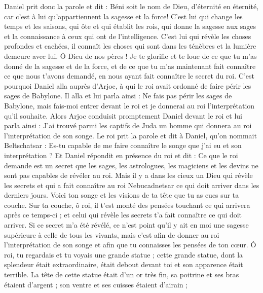 \begin{multicols}{2}
Daniel prit donc la parole et dit : Béni soit le nom de Dieu, d'éternité en éternité, car c'est à lui qu'appartiennent la sagesse et la force!
C'est lui qui change les temps et les saisons, qui ôte et qui établit les rois, qui donne la sagesse aux sages et la connaissance à ceux qui ont de l'intelligence.
C'est lui qui révèle les choses profondes et cachées, il connaît les choses qui sont dans les ténèbres et la lumière demeure avec lui.
Ô Dieu de nos pères ! Je te glorifie et te loue de ce que tu m'as donné de la sagesse et de la force, et de ce que tu m'as maintenant fait connaître ce que nous t'avons demandé, en nous ayant fait connaître le secret du roi.
C'est pourquoi Daniel alla auprès d'Arjoc, à qui le roi avait ordonné de faire périr les sages de Babylone. Il alla et lui parla ainsi : Ne fais pas périr les sages de Babylone, mais fais-moi entrer devant le roi et je donnerai au roi l'interprétation qu'il souhaite.
Alors Arjoc conduisit promptement Daniel devant le roi et lui parla ainsi : J'ai trouvé parmi les captifs de Juda un homme qui donnera au roi l'interprétation de son songe.
Le roi prit la parole et dit à Daniel, qu'on nommait Beltschatsar : Es-tu capable de me faire connaître le songe que j'ai eu et son interprétation ?
Et Daniel répondit en présence du roi et dit : Ce que le roi demande est un secret que les sages, les astrologues, les magiciens et les devins ne sont pas capables de révéler au roi.
Mais il y a dans les cieux un Dieu qui révèle les secrets et qui a fait connaître au roi Nebucadnetsar ce qui doit arriver dans les derniers jours. Voici ton songe et les visions de ta tête que tu as eues sur ta couche.
Sur ta couche, ô roi, il t'est monté des pensées touchant ce qui arrivera après ce temps-ci ; et celui qui révèle les secrets t'a fait connaître ce qui doit arriver.
Si ce secret m'a été révélé, ce n'est point qu'il y ait en moi une sagesse supérieure à celle de tous les vivants, mais c'est afin de donner au roi l'interprétation de son songe et afin que tu connaisses les pensées de ton cœur.
Ô roi, tu regardais et tu voyais une grande statue ; cette grande statue, dont la splendeur était extraordinaire, était debout devant toi et son apparence était terrible.
La tête de cette statue était d'un or très fin, sa poitrine et ses bras étaient d'argent ; son ventre et ses cuisses étaient d'airain ;

\end{multicols}

